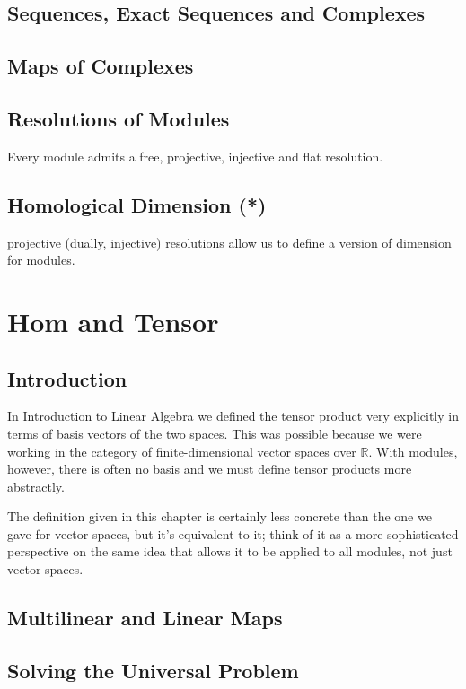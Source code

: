 \documentclass[oneside,english]{amsbook}
\numberwithin{section}{chapter}
\theoremstyle{plain}
\theoremstyle{definition}
\begin{document}
		\section{Sequences, Exact Sequences and Complexes}
		\section{Maps of Complexes}
			
		\section{Resolutions of Modules}
			Every module admits a free, projective, injective and flat resolution. 
			
		\section{Homological Dimension (*)}
			projective (dually, injective) resolutions allow us to define a version of dimension for modules. 

	\chapter{Hom and Tensor}
	
		\section{Introduction}

			In Introduction to Linear Algebra we defined the tensor product very explicitly in terms of basis vectors of the two spaces. This was possible because we were working in the category of finite-dimensional vector spaces over $\mathbb{R}$. With modules, however, there is often no basis and we must define tensor products more abstractly.
			
			The definition given in this chapter is certainly less concrete than the one we gave for vector spaces, but it's equivalent to it; think of it as a more sophisticated perspective on the same idea that allows it to be applied to all modules, not just vector spaces.
			
		\section{Multilinear and Linear Maps}
		
		\section{Solving the Universal Problem}
\end{document}
